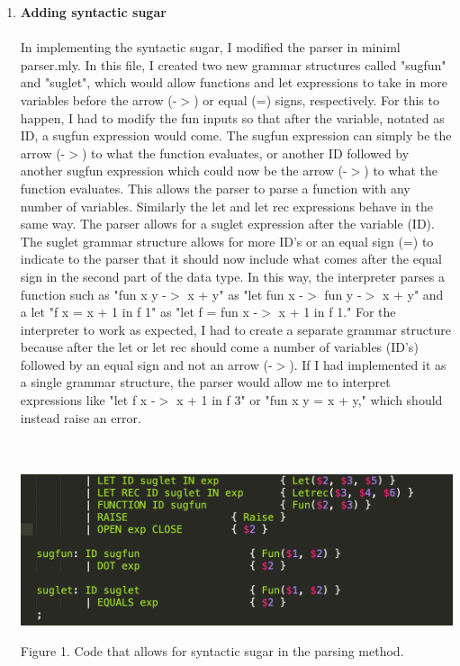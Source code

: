 \documentclass[12pt]{amsart}
\theoremstyle{definition}
\theoremstyle{remark}
\begin{document}
\begin{enumerate}
	\item \textbf{Adding syntactic sugar}\\
	\\
	In implementing the syntactic sugar, I modified the parser in miniml parser.mly. In this file, I created two new grammar structures called "sugfun" and "suglet", which would allow functions and let expressions to take in more variables before the arrow (-$>$) or equal (=) signs, respectively. For this to happen, I had to modify the fun inputs so that after the variable, notated as ID, a sugfun expression would come. The sugfun expression can simply be the arrow (-$>$) to what the function evaluates, or another ID followed by another sugfun expression which could now be the arrow (-$>$) to what the function evaluates. This allows the parser to parse a function with any number of variables. Similarly the let and let rec expressions behave in the same way. The parser allows for a suglet expression after the variable (ID). The suglet grammar structure allows for more ID's or an equal sign (=) to indicate to the parser that it should now include what comes after the equal sign in the second part of the data type. In this way, the interpreter parses a function such as "fun x y -$>$ x + y" as "let fun x -$>$ fun y -$>$ x + y" and a let "f x = x + 1 in f 1" as "let f = fun x -$>$ x + 1 in f 1." For the interpreter to work as expected, I had to create a separate grammar structure because after the let or let rec should come a number of variables (ID's) followed by an equal sign and not an arrow (-$>$). If I had implemented it as a single grammar structure, the parser would allow me to interpret expressions like "let f x -$>$ x + 1 in f 3" or "fun x y = x + y," which should instead raise an error.\\
	\\
	\\
	\centerline{\includegraphics[scale=0.63]{parsercode}}
	\centerline{Figure 1. Code that allows for syntactic sugar in the parsing method.}\\
	\\

\end{enumerate}
\end{document}
